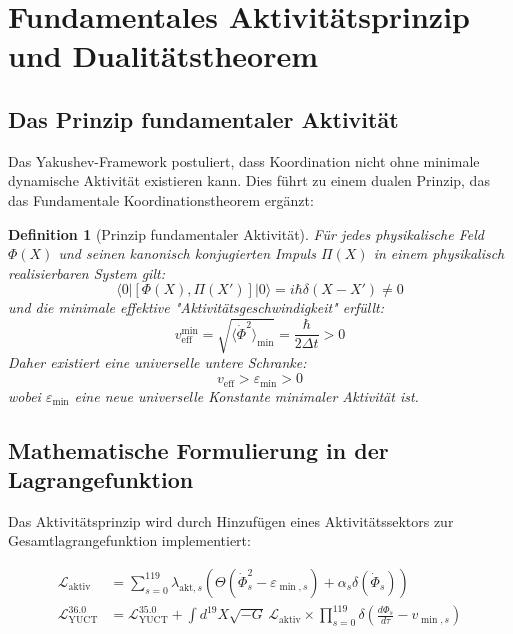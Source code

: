 \documentclass[11pt,a4paper]{article}
\newtheorem{definition}{Definition}
\begin{document}
	
	\section{Fundamentales Aktivitätsprinzip und Dualitätstheorem}
	\label{sec:activity_principle}
	
	\subsection{Das Prinzip fundamentaler Aktivität}
	
	Das Yakushev-Framework postuliert, dass Koordination nicht ohne minimale dynamische Aktivität existieren kann. Dies führt zu einem dualen Prinzip, das das Fundamentale Koordinationstheorem ergänzt:
	
	\begin{definition}[Prinzip fundamentaler Aktivität]
		Für jedes physikalische Feld $\Phi(X)$ und seinen kanonisch konjugierten Impuls $\Pi(X)$ in einem physikalisch realisierbaren System gilt:
		\[
		\langle 0 | [\Phi(X), \Pi(X')] | 0 \rangle = i\hbar\delta(X-X') \neq 0
		\]
		und die minimale effektive "Aktivitätsgeschwindigkeit" erfüllt:
		\[
		v_{\mathrm{eff}}^{\min} = \sqrt{\langle \dot{\Phi}^2 \rangle_{\min}} = \frac{\hbar}{2\Delta t} > 0
		\]
		Daher existiert eine universelle untere Schranke:
		\[
		\boxed{v_{\mathrm{eff}} > \varepsilon_{\min} > 0}
		\]
		wobei $\varepsilon_{\min}$ eine neue universelle Konstante minimaler Aktivität ist.
	\end{definition}
	
	\subsection{Mathematische Formulierung in der Lagrangefunktion}
	
	Das Aktivitätsprinzip wird durch Hinzufügen eines Aktivitätssektors zur Gesamtlagrangefunktion implementiert:
	
	\begin{align}
		\mathcal{L}_{\mathrm{aktiv}} &= \sum_{s=0}^{119} \lambda_{\mathrm{akt},s} \left( \Theta(\dot{\Phi}_s^2 - \varepsilon_{\min,s}) + \alpha_s \delta(\dot{\Phi}_s) \right) \\
		\mathcal{L}_{\mathrm{YUCT}}^{36.0} &= \mathcal{L}_{\mathrm{YUCT}}^{35.0} + \int d^{19}X \sqrt{-G} \, \mathcal{L}_{\mathrm{aktiv}} \times \prod_{s=0}^{119} \delta\left( \frac{d\Phi_s}{d\tau} - v_{\min,s} \right)
	\end{align}
	
\end{document}
